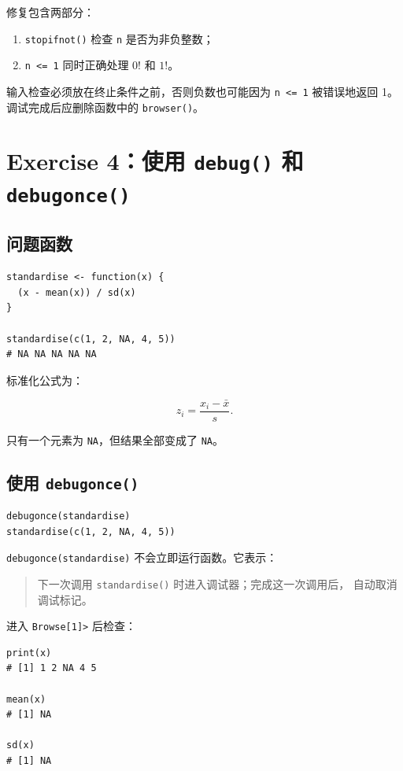 \documentclass[11pt,a4paper]{ctexart}
\begin{document}
修复包含两部分：

\begin{enumerate}
  \item \lstinline|stopifnot()| 检查 \lstinline|n| 是否为非负整数；
  \item \lstinline|n <= 1| 同时正确处理 \(0!\) 和 \(1!\)。
\end{enumerate}

输入检查必须放在终止条件之前，否则负数也可能因为
\lstinline|n <= 1| 被错误地返回 1。调试完成后应删除函数中的
\lstinline|browser()|。

\section{Exercise 4：使用 \texttt{debug()} 和 \texttt{debugonce()}}

\subsection{问题函数}

\begin{lstlisting}[style=rcode]
standardise <- function(x) {
  (x - mean(x)) / sd(x)
}

standardise(c(1, 2, NA, 4, 5))
# NA NA NA NA NA
\end{lstlisting}

标准化公式为：

\[
z_i = \frac{x_i-\bar{x}}{s}.
\]

只有一个元素为 \lstinline|NA|，但结果全部变成了 \lstinline|NA|。

\subsection{使用 \texttt{debugonce()}}

\begin{lstlisting}[style=rcode]
debugonce(standardise)
standardise(c(1, 2, NA, 4, 5))
\end{lstlisting}

\lstinline|debugonce(standardise)| 不会立即运行函数。它表示：

\begin{quote}
下一次调用 \lstinline|standardise()| 时进入调试器；完成这一次调用后，
自动取消调试标记。
\end{quote}

进入 \lstinline|Browse[1]>| 后检查：

\begin{lstlisting}[style=rcode]
print(x)
# [1] 1 2 NA 4 5

mean(x)
# [1] NA

sd(x)
# [1] NA
\end{lstlisting}
\end{document}
